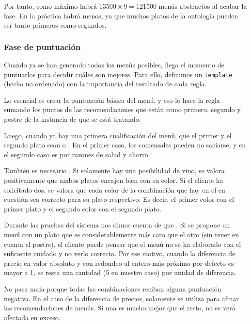 Por tanto, como máximo habrá $13500 \times 9 = 121500$ menús abstractos al
acabar la fase. En la práctica habrá menos, ya que muchos platos de la
ontología pueden ser tanto primeros como segundos.

\subsubsection{Fase de puntuación}
Cuando ya se han generado todos los menús posibles, llega el momento de
puntuarlos para decidir cuáles son mejores. Para ello, definimos un
\verb+template+ (hecho no ordenado)  con la importancia del
resultado de cada regla.

Lo esencial es crear la puntuación básica del menú, y eso lo hace la regla
 sumando los puntos de las recomendaciones que están
como primero, segundo y postre de la instancia de  que se
está tratando.

Luego, cuando ya hay una primera cualificación del menú,  que el primer y el segundo plato sean  o
. En el primer caso, los comensales pueden no saciarse, y en el
segundo caso es por razones de salud y ahorro. 

También es necesario . Si solamente hay una posibilidad de vino, se valora positivamente
que ambos platos encajen bien con su color. Si el cliente ha solicitado dos, se
valora que cada color de la combinación que hay en el  en
cuestión sea correcto para su plato respectivo. Es decir, el primer color con
el primer plato y el segundo color con el segundo plato.

Durante las pruebas del sistema nos dimos cuenta de que . Si se propone un menú con un plato
que es considerablemente más caro que el otro (sin tener en cuenta el postre),
el cliente puede pensar que el menú no se ha elaborado con el suficiente
cuidado y no verlo correcto. Por ese motivo, cuando la diferencia de precio en
valor absoluto y con redondeo al entero más próximo por defecto es mayor a 1,
se resta una cantidad (5 en nuestro caso) por unidad de diferencia.

No pasa nada porque todas las combinaciones reciban alguna puntuación
negativa. En el caso de la diferencia de precios, solamente se utiliza para
afinar las recomendaciones de menús. Si una es mucho mejor que el resto, no se
verá afectada en exceso.

